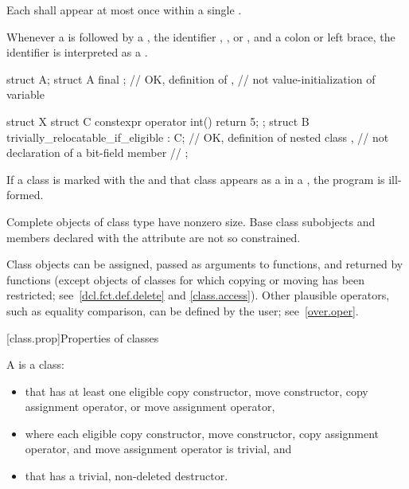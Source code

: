 \pnum
Each  shall appear at most once within
a single .

Whenever a  is followed by a ,
the identifier , , or
, and a colon or left brace,
the identifier is interpreted as a .


\begin{example}
\begin{codeblock}
struct A;
struct A final {};      // OK, definition of ,
                        // not value-initialization of variable 

struct X {
 struct C { constexpr operator int() { return 5; } };
 struct B trivially_relocatable_if_eligible : C{};
                        // OK, definition of nested class ,
                        // not declaration of a bit-field member
                        // 
};
\end{codeblock}
\end{example}

\pnum
If a class is marked with the 
 and that class appears as a 
in a , the program is ill-formed.

\pnum
\begin{note}
Complete objects of class type have nonzero size.
Base class subobjects and
members declared with the  attribute
are not so constrained.
\end{note}

\pnum
\begin{note}
Class objects can be assigned,
passed as arguments to functions, and
returned by functions (except objects of classes for which copying or moving has
been restricted; see~\ref{dcl.fct.def.delete} and \ref{class.access}).
Other plausible operators, such as equality comparison,
can be defined by the user; see~\ref{over.oper}.
\end{note}

[class.prop]{Properties of classes}

\pnum
A  is a class:
\begin{itemize}
\item that has at least one eligible
copy constructor, move constructor,
copy assignment operator, or
move assignment operator,
\item where each eligible copy constructor, move constructor, copy assignment operator,
and move assignment operator is trivial, and
\item that has a trivial, non-deleted destructor.
\end{itemize}

